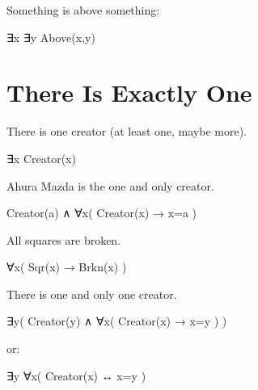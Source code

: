 \documentclass[12pt]{extarticle}
\begin{document}
\begin{multicols*}{3}
\begin{minipage}{\columnwidth}
Something is above something:
 
\hspace{3mm} ∃x ∃y Above(x,y)
 
\end{minipage}
 
 
 
\section{There Is Exactly One}
 
There is one creator (at least one, maybe more).
 
\hspace{3mm} ∃x Creator(x)
 
Ahura Mazda is the one and only creator.
 
\hspace{3mm} Creator(a) ∧ ∀x( Creator(x) → x=a )
 
All squares are broken.
 
\hspace{3mm} ∀x( Sqr(x) → Brkn(x) )
 
There is one and only one creator.
 
\hspace{3mm} ∃y( Creator(y) ∧ ∀x( Creator(x) → x=y ) )
 
\hspace{3mm} or:
 
\hspace{3mm} ∃y ∀x( Creator(x) ↔ x=y )
 
 
 
\vfill


 


\end{multicols*}
\end{document}
